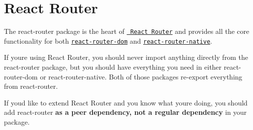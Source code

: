 \chapter{React Router}
\hypertarget{md__2home_2solype_2delivery_2current__days_2trello_2front_2node__modules_2react-router_2README}{}\label{md__2home_2solype_2delivery_2current__days_2trello_2front_2node__modules_2react-router_2README}
\label{md__2home_2solype_2delivery_2current__days_2trello_2front_2node__modules_2react-router_2README_autotoc_md12129}%
%
 The {\ttfamily react-\/router} package is the heart of \href{https://github.com/remix-run/react-router}{\texttt{ React Router}} and provides all the core functionality for both \href{https://github.com/remix-run/react-router/tree/main/packages/react-router-dom}{\texttt{ {\ttfamily react-\/router-\/dom}}} and \href{https://github.com/remix-run/react-router/tree/main/packages/react-router-native}{\texttt{ {\ttfamily react-\/router-\/native}}}.

If you\textquotesingle{}re using React Router, you should never {\ttfamily import} anything directly from the {\ttfamily react-\/router} package, but you should have everything you need in either {\ttfamily react-\/router-\/dom} or {\ttfamily react-\/router-\/native}. Both of those packages re-\/export everything from {\ttfamily react-\/router}.

If you\textquotesingle{}d like to extend React Router and you know what you\textquotesingle{}re doing, you should add {\ttfamily react-\/router} {\bfseries{as a peer dependency, not a regular dependency}} in your package. 